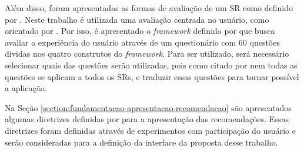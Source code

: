 Além disso, foram apresentadas as formas de avaliação de um SR como definido por . Neste
trabalho é utilizada uma avaliação centrada no usuário, como orientado por . Por isso, é
apresentado o \textit{framework} definido por  que busca avaliar a experiência do usuário através de um
questionário com 60 questões dividas nos quatro construtos do \textit{framework}. Para ser utilizado, será necessário
selecionar quais das questões serão utilizadas, pois como citado por  nem todas as questões se
aplicam a todos os SRs, e traduzir essas questões para tornar possível a aplicação.

Na Seção \ref{section:fundamentacao-apresentacao-recomendacao} são apresentados algumas diretrizes definidas por
 para a apresentação das recomendações. Essas diretrizes foram definidas através de
experimentos com participação do usuário e serão consideradas para a definição da interface da proposta desse trabalho.
